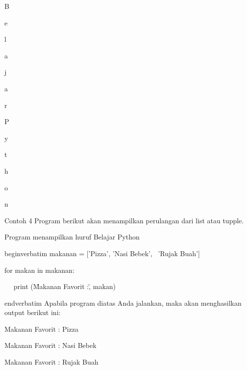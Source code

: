 \vspace{\baselineskip}
 \par
B \par
e \par
l \par
a \par
j \par
a \par
r \par
  \par
P \par
y \par
t \par
h \par
o \par
n \par
\vspace{12pt}
Contoh 4\vspace{\baselineskip}
\vspace{\baselineskip}
Program berikut akan menampilkan perulangan dari list atau tupple.\vspace{\baselineskip}
\vspace{\baselineskip}
 \par
Program menampilkan huruf Belajar Python \par
\vspace{12pt}
begin{verbatim}
makanan = ['Pizza', 'Nasi Bebek',~ 'Rujak Buah'] \par
for makan in makanan: \par
~~ print (\"Makanan Favorit :\", makan) \par
end{verbatim}
\vspace{12pt}
Apabila program diatas Anda jalankan, maka akan menghasilkan output berikut ini:\vspace{\baselineskip}
\vspace{\baselineskip}
 \par
Makanan Favorit : Pizza \par
Makanan Favorit : Nasi Bebek \par
Makanan Favorit : Rujak Buah \par
\vspace{12pt}
\vspace{\baselineskip}
\vspace{12pt}
